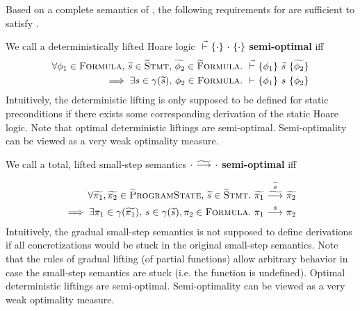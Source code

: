 Based on a complete semantics of \svl, the following requirements for \gvl are sufficient to satisfy .
\begin{definition}
    \label{def:perf-stat}
    We call a deterministically lifted Hoare logic $\dgthoare{}{\cdot}{\cdot}{\cdot}$ \textbf{semi-optimal} iff
    \begin{align*}
    \forall \phi_1 \in \setFormula,\, \grad{s} \in \setGStmt,\, \grad{\phi_2} \in \setGFormula.&~ \dgthoare{}{\phi_1}{\grad{s}}{\grad{\phi_2}}\\ \implies \exists s \in \gamma(\grad{s}),\, \phi_2 \in \setFormula.&~ \thoare{}{\phi_1}{s}{\phi_2}
    \end{align*}
    Intuitively, the deterministic lifting is only supposed to be defined for static preconditions if there exists some corresponding derivation of the static Hoare logic.
    Note that optimal deterministic liftings are semi-optimal.
    Semi-optimality can be viewed as a very weak optimality measure.
\end{definition}
\begin{definition}
    \label{def:perf-dyn}
    We call a total, lifted small-step semantics $\gsstep{\cdot}{\cdot}$ \textbf{semi-optimal} iff
    \begin{comment}
    \forall \grad{\pi} \in \setGProgramState.~ (\forall \pi \in \gamma(\grad{\pi}).~ \sstepStuck{\pi}) \implies \gsstep{\grad{\pi}}{\pi_{EX}}
    \end{comment}
    \begin{align*}
    \forall \grad{\pi_1}, \grad{\pi_2} \in \setGProgramState,\, \grad{s} \in \setGStmt.&~ \gsstepConsume{\grad{s}}{\grad{\pi_1}}{\grad{\pi_2}}\\ \implies \exists \pi_1 \in \gamma(\grad{\pi_1}),\, s \in \gamma(\grad{s}), \pi_2 \in \setFormula.&~ \sstepConsume{s}{\pi_1}{\pi_2}
    \end{align*}
    Intuitively, the gradual small-step semantics is not supposed to define derivations if all concretizations would be stuck in the original small-step semantics.
    Note that the rules of gradual lifting (of partial functions) allow arbitrary behavior in case the small-step semantics are stuck (i.e. the function is undefined).
    Optimal deterministic liftings are semi-optimal.
    Semi-optimality can be viewed as a very weak optimality measure.
\end{definition}

